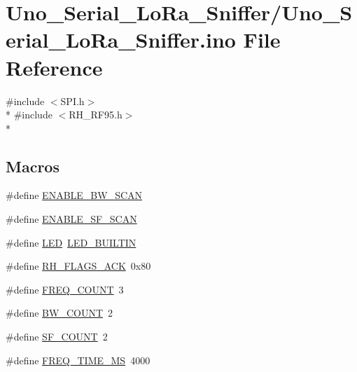 \hypertarget{Uno__Serial__LoRa__Sniffer_8ino}{\section{Uno\-\_\-\-Serial\-\_\-\-Lo\-Ra\-\_\-\-Sniffer/\-Uno\-\_\-\-Serial\-\_\-\-Lo\-Ra\-\_\-\-Sniffer.ino File Reference}
\label{Uno__Serial__LoRa__Sniffer_8ino}
}
{\ttfamily \#include $<$S\-P\-I.\-h$>$}\\*
{\ttfamily \#include $<$R\-H\-\_\-\-R\-F95.\-h$>$}\\*
\subsection*{Macros}
\begin{DoxyCompactItemize}
\item 
\#define \hyperlink{Uno__Serial__LoRa__Sniffer_8ino_ae8853e200bea46f5279ccc9060c3ac9f}{E\-N\-A\-B\-L\-E\-\_\-\-B\-W\-\_\-\-S\-C\-A\-N}
\item 
\#define \hyperlink{Uno__Serial__LoRa__Sniffer_8ino_a80c74eab2529f239d24f54e68d7dfca8}{E\-N\-A\-B\-L\-E\-\_\-\-S\-F\-\_\-\-S\-C\-A\-N}
\item 
\#define \hyperlink{Uno__Serial__LoRa__Sniffer_8ino_aeb7a7ba1ab7e0406f1b5ab36d579f585}{L\-E\-D}~\hyperlink{Helvetiny__Blink__CDC_8ino_a450a7c16ead7b3c7b882536b08f30a00}{L\-E\-D\-\_\-\-B\-U\-I\-L\-T\-I\-N}
\item 
\#define \hyperlink{Uno__Serial__LoRa__Sniffer_8ino_aaa142aefbb4b2665e2ac26f5922228d7}{R\-H\-\_\-\-F\-L\-A\-G\-S\-\_\-\-A\-C\-K}~0x80
\item 
\#define \hyperlink{Uno__Serial__LoRa__Sniffer_8ino_ad17aede54a50ee40840cd567946cdd40}{F\-R\-E\-Q\-\_\-\-C\-O\-U\-N\-T}~3
\item 
\#define \hyperlink{Uno__Serial__LoRa__Sniffer_8ino_a77c97ad595d6a698495d283ebccb9ec6}{B\-W\-\_\-\-C\-O\-U\-N\-T}~2
\item 
\#define \hyperlink{Uno__Serial__LoRa__Sniffer_8ino_af76f3b8a859dbeb2fbd4a478dd3f4301}{S\-F\-\_\-\-C\-O\-U\-N\-T}~2
\item 
\#define \hyperlink{Uno__Serial__LoRa__Sniffer_8ino_a549b09ef451f4afb4cc98ec7d945cf69}{F\-R\-E\-Q\-\_\-\-T\-I\-M\-E\-\_\-\-M\-S}~4000
\end{DoxyCompactItemize}

